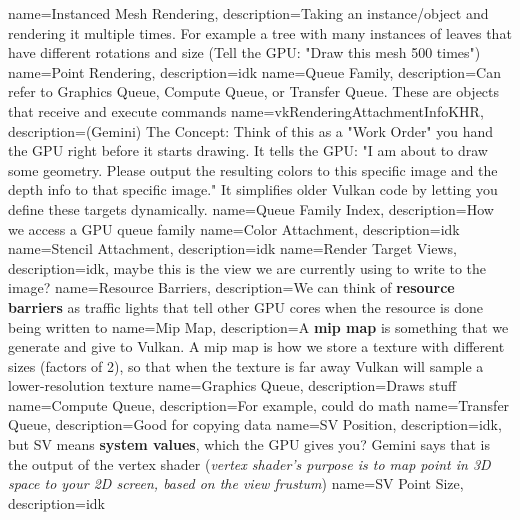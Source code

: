 \documentclass{article}
\begin{document}
{
name={Instanced Mesh Rendering},
description={Taking an instance/object and rendering it multiple
  times. For example a tree with many instances of leaves that have
different rotations and size (Tell the GPU: "Draw this mesh 500 times")}
}
{
name={Point Rendering},
description={idk}
}
{
name={Queue Family},
description={Can refer to Graphics Queue, Compute Queue, or
Transfer Queue. These are objects that receive and execute commands}
}
{
name={vkRenderingAttachmentInfoKHR},
description={(Gemini) The Concept: Think of this as a "Work Order" you hand
  the GPU right before it starts drawing. It tells the GPU: "I am about
  to draw some geometry. Please output the resulting colors to this
  specific image and the depth info to that specific image." It
simplifies older Vulkan code by letting you define these targets dynamically.}
}
{
name={Queue Family Index},
description={How we access a GPU queue family}
}
{
name={Color Attachment},
description={idk}
}
{
name={Stencil Attachment},
description={idk}
}
{
name={Render Target Views},
description={idk, maybe this is the view we are currently using to
write to the image?}
}
{
name={Resource Barriers},
description={We can think of \textbf{resource barriers} as traffic
lights that tell other GPU cores when the resource is done being written to}
}
{
name={Mip Map},
description={A \textbf{mip map} is something that we generate and
  give to Vulkan. A mip map is how we store a texture with different
  sizes (factors of 2), so that when the texture is far away Vulkan
will sample a lower-resolution texture}
}
{
name={Graphics Queue},
description={Draws stuff}
}
{
name={Compute Queue},
description={For example, could do math}
}
{
name={Transfer Queue},
description={Good for copying data}
}
{
name={SV Position},
description={idk, but SV means \textbf{system values}, which the GPU
  gives you? Gemini says that is the output of the vertex shader
  (\textit{vertex shader's purpose is to map point in 3D space to your
2D screen, based on the view frustum})}
}
{
name={SV Point Size},
description={idk}
}
\end{document}
